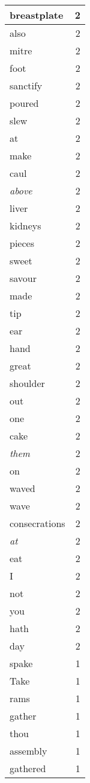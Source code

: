 \begin{center}
\begin{longtable}{l|r}
breastplate & 2 \\ \hline
also & 2 \\ \hline
mitre & 2 \\ \hline
foot & 2 \\ \hline
sanctify & 2 \\ \hline
poured & 2 \\ \hline
slew & 2 \\ \hline
at & 2 \\ \hline
make & 2 \\ \hline
caul & 2 \\ \hline
\emph{above} & 2 \\ \hline
liver & 2 \\ \hline
kidneys & 2 \\ \hline
pieces & 2 \\ \hline
sweet & 2 \\ \hline
savour & 2 \\ \hline
made & 2 \\ \hline
tip & 2 \\ \hline
ear & 2 \\ \hline
hand & 2 \\ \hline
great & 2 \\ \hline
shoulder & 2 \\ \hline
out & 2 \\ \hline
one & 2 \\ \hline
cake & 2 \\ \hline
\emph{them} & 2 \\ \hline
on & 2 \\ \hline
waved & 2 \\ \hline
wave & 2 \\ \hline
consecrations & 2 \\ \hline
\emph{at} & 2 \\ \hline
eat & 2 \\ \hline
I & 2 \\ \hline
not & 2 \\ \hline
you & 2 \\ \hline
hath & 2 \\ \hline
day & 2 \\ \hline
spake & 1 \\ \hline
Take & 1 \\ \hline
rams & 1 \\ \hline
gather & 1 \\ \hline
thou & 1 \\ \hline
assembly & 1 \\ \hline
gathered & 1 \\ \hline

\end{longtable}
\end{center}
